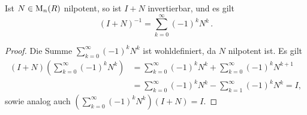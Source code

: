\begin{lemma}
  \label{lemma: inverse for unipotent}
  Ist $N \in \operatorname{M}_{n}(R)$ nilpotent, so ist $I + N$ invertierbar, und es gilt
  \[
      (I+N)^{-1}
    = \sum_{k=0}^\infty (-1)^k N^k\,.
  \]
\end{lemma}

\begin{proof}
  Die Summe $\sum_{k=0}^\infty (-1)^k N^k$ ist wohldefiniert, da $N$ nilpotent ist.
  Es gilt
  \begin{align*}
        (I+N)\left( \sum_{k=0}^\infty (-1)^k N^k \right)
    &=  \sum_{k=0}^\infty (-1)^k N^k + \sum_{k=0}^\infty (-1)^k N^{k+1}
    \\
    &=  \sum_{k=0}^\infty (-1)^k N^k - \sum_{k=1}^\infty (-1)^k N^k
     =  I,
  \end{align*}
  sowie analog auch $(\sum_{k=0}^\infty (-1)^k N^k) (I+N) = I$.
\end{proof}

